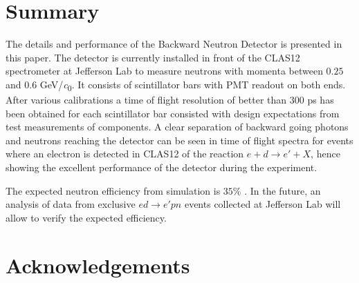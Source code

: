 \documentclass[3p,final,twocolumn]{elsarticle}
\begin{document}
{\section{Summary}
The details and performance of the Backward Neutron Detector is presented in this paper. The detector is currently installed in front of the CLAS12 spectrometer at Jefferson Lab to measure neutrons with momenta between $0.25$ and $0.6$ \si{\GeV/\clight}.  It consists of scintillator bars with PMT readout on both ends.
After various calibrations a time of flight resolution of better than 300 \si{\pico\s} has been obtained for each scintillator bar consisted with design expectations from test measurements of components. A clear separation of backward going photons and neutrons reaching the detector can be seen in time of flight spectra for events where an electron is detected in CLAS12 of the reaction $e+d \rightarrow e'+X$, hence showing the excellent performance of the detector during the experiment.

The expected neutron efficiency from simulation is $35$\% . In the future, an analysis of data from exclusive $ed \rightarrow e'pn$ events collected at Jefferson Lab will allow to verify the expected efficiency.


\section{Acknowledgements}

\clearpage

}
\end{document}
